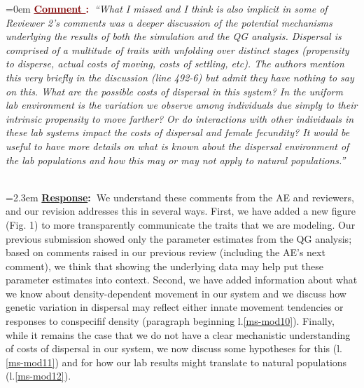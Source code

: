 \documentclass[12pt]{article}
\newcounter{cN}
\newcommand{\comment}[1]{
	\vspace{2em}
	\refstepcounter{cN} %
	\noindent \hangindent=0em \textbf{\textcolor{Maroon}{\uline{Comment \thecN}:~}}\emph{``#1''}
	}
\newcommand{\response}[1]{
	\\[0.25em]
	\hangindent=2.3em \textbf{\textcolor{NavyBlue}{\uline{Response}:~}}#1
	}
\begin{document}
\comment{What I missed and I think is also implicit in some of Reviewer 2’s comments was a deeper discussion of the potential mechanisms underlying the results of both the simulation and the QG analysis.
Dispersal is comprised of a multitude of traits with unfolding over distinct stages (propensity to disperse, actual costs of moving, costs of settling, etc).
The authors mention this very briefly in the discussion (line 492-6) but admit they have nothing to say on this.
What are the possible costs of dispersal in this system?
In the uniform lab environment is the variation we observe among individuals due simply to their intrinsic propensity to move farther?
Or do interactions with other individuals in these lab systems impact the costs of dispersal and female fecundity?
It would be useful to have more details on what is known about the dispersal environment of the lab populations and how this may or may not apply to natural populations.}
\response{We understand these comments from the AE and reviewers, and our revision addresses this in several ways.
First, we have added a new figure (Fig. 1) to more transparently communicate the traits that we are modeling.
Our previous submission showed only the parameter estimates from the QG analysis; based on comments raised in our previous review (including the AE's next comment), we think that showing the underlying data may help put these parameter estimates into context.
Second, we have added information about what we know about density-dependent movement in our system and we discuss how genetic variation in dispersal may reflect either innate movement tendencies or responses to conspecifif density (paragraph beginning l.\ref{ms-mod10}).
Finally, while it remains the case that we do not have a clear mechanistic understanding of costs of dispersal in our system, we now discuss some hypotheses for this (l.\ref{ms-mod11}) and for how our lab results might translate to natural populations (l.\ref{ms-mod12}).
}
\end{document}
